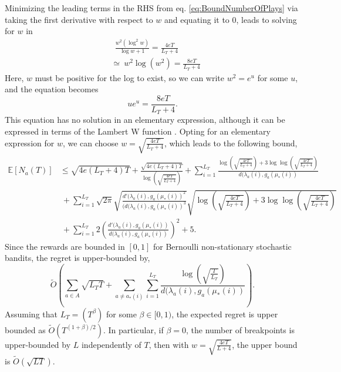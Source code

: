 \documentclass[letterpaper]{article} %
\newcommand{\bE}{\mathds{E}}
\newcommand{\optMeanAtIChanges}[1]{\mu_{*}(#1)}
\newcommand{\MeanFeAtIChanges}[2]{\lambda_#1(#2)}
\newcommand{\optArmAtIChanges}[1]{a_{*}(#1)}
\newcommand{\numChanges}{L}
\newcommand{\windowsize}{w}
\begin{document}
\noindent Minimizing the leading terms in the RHS from eq. \eqref{eq:BoundNumberOfPlays} via taking the first derivative with respect to $\windowsize$ and equating it to $0$, leads to solving for $w$ in 
\begin{align*}
    & \ \ \frac{\windowsize^2 \left( \log^2{\windowsize} \right)}{\log{\windowsize} + 1} = \frac{4e T}{\numChanges_T + 4} \\
    & \simeq \ \windowsize^2 \log{(\windowsize^2)} = \frac{8 e T}{\numChanges_T + 4 } 
\end{align*}
Here, $\windowsize$ must be positive for the log to exist, so we can write $\windowsize^2 = e^u$ for some $u$, and the equation becomes
\begin{equation*}
    u e^u = \frac{8 e T}{\numChanges_T + 4}.
\end{equation*}
This equation has no solution in an elementary expression, although it can be expressed in terms of the Lambert W function \citep{Corless1996}. Opting for an elementary expression for $\windowsize$, we can choose $\windowsize = \sqrt{ \frac{4eT}{\numChanges_T + 4}}$, which leads to the following bound, 
\begin{align*}
    \bE[N_a(T)]  &\leq \sqrt{4 e (\numChanges_T + 4) T} + \frac{\sqrt{4 e (\numChanges_T + 4) T}}{\log{\left(\sqrt{ \frac{4eT}{ \numChanges_T + 4}}\right)}} + \sum_{i=1}^{\numChanges_T} \frac{ \log{\left(  \sqrt{ \frac{4eT}{\numChanges_T + 4}} \right)} + 3\log{\log{\left(  \sqrt{ \frac{4eT}{\numChanges_T + 4}} \right)}}}{d(\MeanFeAtIChanges{a}{i},g_a(\optMeanAtIChanges{i})} \\
    & \ + \sum_{i=1}^{\numChanges_T} \sqrt{2\pi}\sqrt{\frac{d'(\MeanFeAtIChanges{a}{i},g_a(\optMeanAtIChanges{i})^2}{(d(\MeanFeAtIChanges{a}{i},g_a(\optMeanAtIChanges{i})^3}}\sqrt{ \log{\left(  \sqrt{ \frac{4eT}{\numChanges_T + 4}} \right)} + 3\log{\log{\left(  \sqrt{ \frac{4eT}{\numChanges_T + 4}} \right)}}} \nonumber \\
    & \ + \sum_{i=1}^{\numChanges_T} 2 \left(\frac{d'(\MeanFeAtIChanges{a}{i},g_a(\optMeanAtIChanges{i})}{d(\MeanFeAtIChanges{a}{i},g_a(\optMeanAtIChanges{i})}\right)^{2} +  5.
\end{align*}
Since the rewards are bounded in $[0,1]$ for Bernoulli non-stationary stochastic bandits, the regret is upper-bounded by,
\begin{equation*}
     \tilde{O}\left( \sum_{a \in A} \sqrt{\numChanges_T T} + \sum_{a \neq \optArmAtIChanges{i}} \sum_{i=1}^{\numChanges_T} \frac{\log{\left(  \sqrt{ \frac{T}{\numChanges_T}} \right)}}{d(\MeanFeAtIChanges{a}{i},g_a(\optMeanAtIChanges{i})}   \right).
\end{equation*}
Assuming that $\numChanges_T = \left( T^\beta \right)$ for some $\beta \in [0,1)$, the expected regret is upper bounded as $\tilde{O}\left(T^{(1 + \beta)/2}\right)$. In particular, if $\beta = 0$, the number of breakpoints is upper-bounded by $\numChanges$ independently of $T$, then with $\windowsize = \sqrt{ \frac{4eT}{\numChanges + 4}}$, the upper bound is $\tilde{O}\left( \sqrt{\numChanges T} \right)$.
\end{document}
